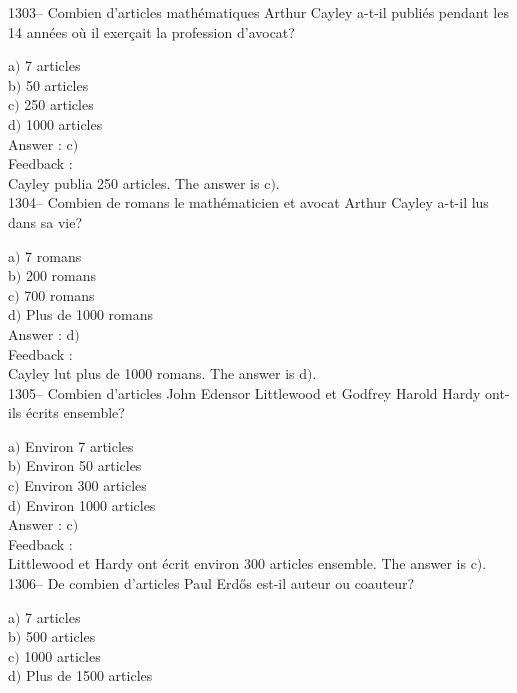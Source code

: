 ﻿\documentclass[letterpaper, 12pt]{article}
\begin{document}
1303-- Combien d'articles math\'ematiques Arthur Cayley a-t-il
publi\'es pendant les 14 ann\'ees o\`u il exer\c cait la profession
d'avocat?

a$)$ 7 articles \\
b$)$ 50 articles \\
c$)$ 250 articles\\
d$)$ 1000 articles\\

Answer : c$)$\\

Feedback : \\
Cayley publia 250 articles.
The answer is  c$)$.\\

1304-- Combien de romans le math\'ematicien et avocat Arthur Cayley
a-t-il lus dans sa vie?

a$)$ 7 romans \\
b$)$ 200 romans \\
c$)$ 700 romans\\
d$)$ Plus de 1000 romans\\

Answer : d$)$\\

Feedback : \\
Cayley lut plus de 1000 romans.
The answer is  d$)$.\\

1305-- Combien d'articles John Edensor Littlewood et Godfrey Harold
Hardy ont-ils \'ecrits ensemble?

a$)$ Environ 7 articles \\
b$)$ Environ 50 articles \\
c$)$ Environ 300 articles\\
d$)$ Environ 1000 articles\\

Answer : c$)$\\

Feedback : \\
Littlewood et Hardy ont \'ecrit environ 300 articles ensemble.
The answer is  c$)$.\\

1306-- De combien d'articles Paul Erd\H{o}s est-il auteur ou
coauteur?

a$)$ 7 articles \\
b$)$ 500 articles \\
c$)$ 1000 articles\\
d$)$ Plus de 1500 articles\\
\end{document}
